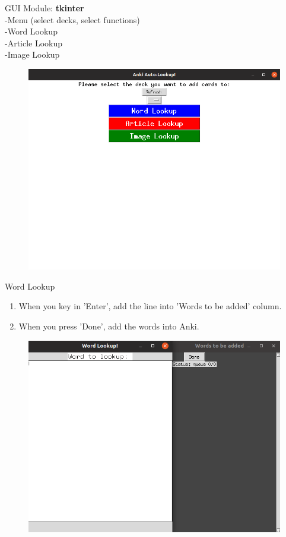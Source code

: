 \documentclass{beamer}
\begin{document}
\begin{frame}{GUI}
		\text Module: \textbf{tkinter}\\
		\text -Menu (select decks, select functions)\\
		\indent -Word Lookup\\
		\indent -Article Lookup\\
		\indent -Image Lookup\\
		\begin{figure}[h]
				\centering
				\includegraphics[width=0.6\linewidth]{./GUI_main.png}
		\end{figure}
\end{frame}

\begin{frame}{Word Lookup}
	\begin{enumerate}
		\item When you key in 'Enter', add the line into 'Words to be added' column.
		\item When you press 'Done', add the words into Anki.
	\end{enumerate}
	\begin{figure}[h]
			\centering
			\includegraphics[width=0.6\linewidth]{./word_lookup_gui.png}
	\end{figure}
\end{frame}
\end{document}
